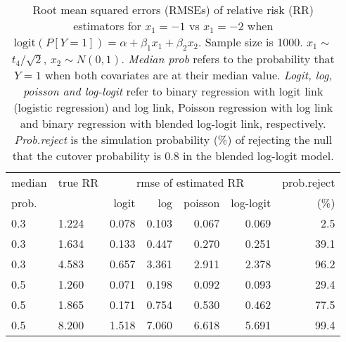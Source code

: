 \documentclass[12pt,a4paper]{article}
\begin{document}
\begin{table}[H] 
\small\sf\centering 
\caption{Root mean squared errors (RMSEs) of relative risk (RR) estimators for $x_1=-1$ vs $x_1=-2$ when $\mbox{logit}(P[Y=1])=\alpha+\beta_1 x_1 + \beta_2 x_2$. Sample size is 1000. $x_1 \sim $$t_4/\sqrt{2}$, $x_2 \sim N(0,1)$. {\it Median prob} refers to the probability that $Y=1$ when both covariates are at their median value. {\it Logit, log, poisson and log-logit} refer to binary regression with logit link (logistic regression) and log link, Poisson regression with log link and binary regression with blended log-logit link, respectively. {\it Prob.reject} is the simulation probability (\%) of rejecting the null that the cutover probability is $0.8$ in the blended log-logit model.} 
\begin{tabular}{llrrrrr} 
\toprule 
median & true RR & \multicolumn{4}{c}{rmse of estimated RR} & prob.reject \\ 
prob. & & logit & log & poisson & log-logit  & (\%) \\ \midrule 
0.3 & 1.224 & 0.078 & 0.103 & 0.067 & 0.069 &  2.5 \\  
0.3 & 1.634 & 0.133 & 0.447 & 0.270 & 0.251 & 39.1 \\  
0.3 & 4.583 & 0.657 & 3.361 & 2.911 & 2.378 & 96.2 \\  
0.5 & 1.260 & 0.071 & 0.198 & 0.092 & 0.093 & 29.4 \\  
0.5 & 1.865 & 0.171 & 0.754 & 0.530 & 0.462 & 77.5 \\  
0.5 & 8.200 & 1.518 & 7.060 & 6.618 & 5.691 & 99.4 \\  
\bottomrule 
\end{tabular} 
\end{table} 
\end{document}
